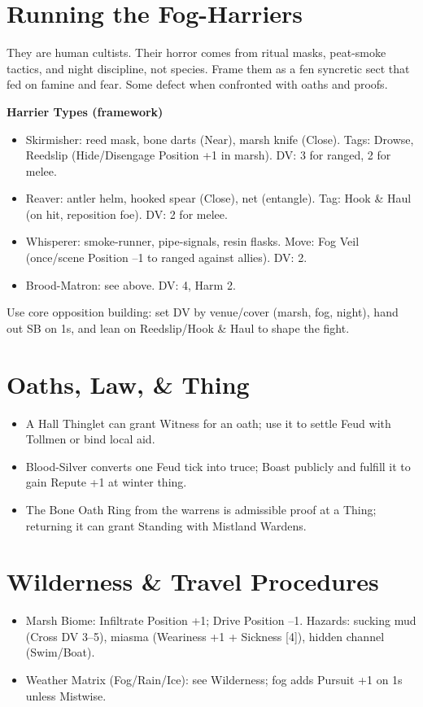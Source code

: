 \documentclass[11pt]{article}
\begin{document}
\section{Running the Fog-Harriers}

They are human cultists. Their horror comes from ritual masks, peat-smoke tactics, and night discipline, not species. Frame them as a fen syncretic sect that fed on famine and fear. Some defect when confronted with oaths and proofs.

\textbf{Harrier Types (framework)}
\begin{itemize}
\item Skirmisher: reed mask, bone darts (Near), marsh knife (Close). Tags: Drowse, Reedslip (Hide/Disengage Position +1 in marsh). DV: 3 for ranged, 2 for melee.
\item Reaver: antler helm, hooked spear (Close), net (entangle). Tag: Hook \& Haul (on hit, reposition foe). DV: 2 for melee.
\item Whisperer: smoke-runner, pipe-signals, resin flasks. Move: Fog Veil (once/scene Position --1 to ranged against allies). DV: 2.
\item Brood-Matron: see above. DV: 4, Harm 2.
\end{itemize}

Use core opposition building: set DV by venue/cover (marsh, fog, night), hand out SB on 1s, and lean on Reedslip/Hook \& Haul to shape the fight.

\section{Oaths, Law, \& Thing}
\begin{itemize}
\item A Hall Thinglet can grant Witness for an oath; use it to settle Feud with Tollmen or bind local aid.
\item Blood-Silver converts one Feud tick into truce; Boast publicly and fulfill it to gain Repute +1 at winter thing.
\item The Bone Oath Ring from the warrens is admissible proof at a Thing; returning it can grant Standing with Mistland Wardens.
\end{itemize}

\section{Wilderness \& Travel Procedures}
\begin{itemize}
\item Marsh Biome: Infiltrate Position +1; Drive Position --1. Hazards: sucking mud (Cross DV 3--5), miasma (Weariness +1 + Sickness [4]), hidden channel (Swim/Boat).
\item Weather Matrix (Fog/Rain/Ice): see Wilderness; fog adds Pursuit +1 on 1s unless Mistwise.
\end{itemize}
\end{document}
